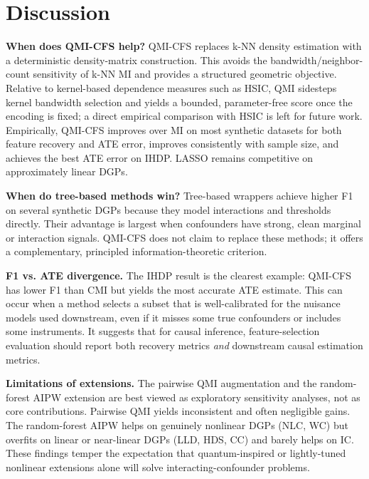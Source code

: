 \documentclass{svproc}
\begin{document}


\section{Discussion}
\label{sec:discussion}

\textbf{When does QMI-CFS help?} QMI-CFS replaces k-NN density estimation with a deterministic density-matrix construction. This avoids the bandwidth/neighbor-count sensitivity of k-NN MI and provides a structured geometric objective. Relative to kernel-based dependence measures such as HSIC, QMI sidesteps kernel bandwidth selection and yields a bounded, parameter-free score once the encoding is fixed; a direct empirical comparison with HSIC is left for future work. Empirically, QMI-CFS improves over MI on most synthetic datasets for both feature recovery and ATE error, improves consistently with sample size, and achieves the best ATE error on IHDP. LASSO remains competitive on approximately linear DGPs.

\textbf{When do tree-based methods win?} Tree-based wrappers achieve higher F1 on several synthetic DGPs because they model interactions and thresholds directly. Their advantage is largest when confounders have strong, clean marginal or interaction signals. QMI-CFS does not claim to replace these methods; it offers a complementary, principled information-theoretic criterion.

\textbf{F1 vs. ATE divergence.} The IHDP result is the clearest example: QMI-CFS has lower F1 than CMI but yields the most accurate ATE estimate. This can occur when a method selects a subset that is well-calibrated for the nuisance models used downstream, even if it misses some true confounders or includes some instruments. It suggests that for causal inference, feature-selection evaluation should report both recovery metrics \textit{and} downstream causal estimation metrics.

\textbf{Limitations of extensions.} The pairwise QMI augmentation and the random-forest AIPW extension are best viewed as exploratory sensitivity analyses, not as core contributions. Pairwise QMI yields inconsistent and often negligible gains. The random-forest AIPW helps on genuinely nonlinear DGPs (NLC, WC) but overfits on linear or near-linear DGPs (LLD, HDS, CC) and barely helps on IC. These findings temper the expectation that quantum-inspired or lightly-tuned nonlinear extensions alone will solve interacting-confounder problems.
\end{document}
